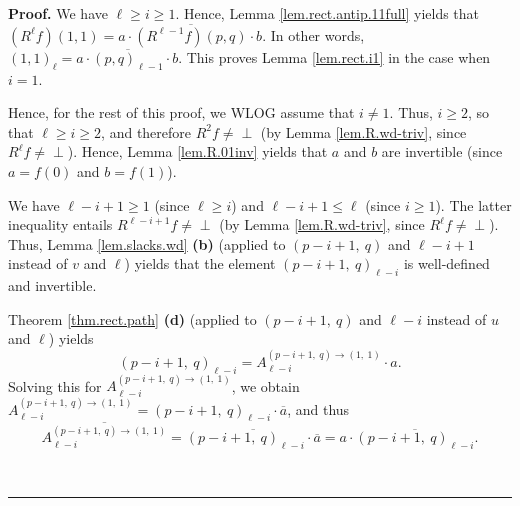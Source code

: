 \documentclass[numbers=enddot,12pt,final,onecolumn,notitlepage]{scrartcl}%
\theoremstyle{definition}
\newenvironment{vershort}{}{}
\newcommand{\undf}{\operatorname*{\bot}}
\newcommand{\downslack}{A}
\newenvironment{proof}[1][Proof]{\noindent\textbf{#1.} }{\ \rule{0.5em}{0.5em}}
\begin{document}
\begin{vershort}


\begin{proof}
We have $\ell\geq i\geq1$. Hence, Lemma \ref{lem.rect.antip.11full} yields
that $\left(  R^{\ell}f\right)  \left(  1,1\right)  =a\cdot\overline{\left(
R^{\ell-1}f\right)  \left(  p,q\right)  }\cdot b$. In other words, $\left(
1,1\right)  _{\ell}=a\cdot\overline{\left(  p,q\right)  _{\ell-1}}\cdot b$.
This proves Lemma \ref{lem.rect.i1} in the case when $i=1$.

Hence, for the rest of this proof, we WLOG assume that $i\neq1$. Thus,
$i\geq2$, so that $\ell\geq i\geq2$, and therefore $R^{2}f\neq\undf$ (by Lemma
\ref{lem.R.wd-triv}, since $R^{\ell}f\neq\undf$). Hence, Lemma
\ref{lem.R.01inv} yields that $a$ and $b$ are invertible (since $a=f\left(
0\right)  $ and $b=f\left(  1\right)  $).

We have $\ell-i+1\geq1$ (since $\ell\geq i$) and $\ell-i+1\leq\ell$ (since
$i\geq1$). The latter inequality entails $R^{\ell-i+1}f\neq\undf$ (by Lemma
\ref{lem.R.wd-triv}, since $R^{\ell}f\neq\undf$). Thus, Lemma
\ref{lem.slacks.wd} \textbf{(b)} (applied to $\left(  p-i+1,\ q\right)  $ and
$\ell-i+1$ instead of $v$ and $\ell$) yields that the element $\left(
p-i+1,\ q\right)  _{\ell-i}$ is well-defined and invertible.

Theorem \ref{thm.rect.path} \textbf{(d)} (applied to $\left(
p-i+1,\ q\right)  $ and $\ell-i$ instead of $u$ and $\ell$) yields
\[
\left(  p-i+1,\ q\right)  _{\ell-i}=\downslack_{\ell-i}^{\left(
p-i+1,\ q\right)  \rightarrow\left(  1,\ 1\right)  }\cdot a.
\]
Solving this for $\downslack_{\ell-i}^{\left(  p-i+1,\ q\right)
\rightarrow\left(  1,\ 1\right)  }$, we obtain $\downslack_{\ell-i}^{\left(
p-i+1,\ q\right)  \rightarrow\left(  1,\ 1\right)  }=\left(  p-i+1,\ q\right)
_{\ell-i}\cdot\overline{a}$, and thus%
\begin{equation}
\overline{\downslack_{\ell-i}^{\left(  p-i+1,\ q\right)  \rightarrow\left(
1,\ 1\right)  }}=\overline{\left(  p-i+1,\ q\right)  _{\ell-i}\cdot
\overline{a}}=a\cdot\overline{\left(  p-i+1,\ q\right)  _{\ell-i}}.
\label{pf.lem.rect.i1.short.1}%
\end{equation}



\end{proof}
\end{vershort}
\end{document}
